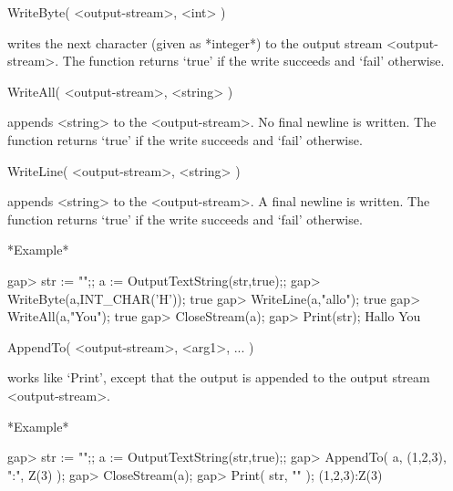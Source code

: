 \>WriteByte( <output-stream>, <int> )

writes the  next  character  (given  as *integer*)  to the  output stream
<output-stream>.  The function  returns `true' if  the write succeeds and
`fail' otherwise.

\>WriteAll( <output-stream>, <string> )

appends  <string> to the <output-stream>.   No final  newline is written.
The function returns `true' if the write succeeds and `fail' otherwise.

\>WriteLine( <output-stream>, <string> )

appends  <string> to  the <output-stream>.   A  final newline is written.
The function returns `true' if the write succeeds and `fail' otherwise.

*Example*

\beginexample
    gap> str := "";; a := OutputTextString(str,true);;
    gap> WriteByte(a,INT_CHAR('H'));
    true
    gap> WriteLine(a,"allo");
    true
    gap> WriteAll(a,"You\n");
    true
    gap> CloseStream(a);
    gap> Print(str);
    Hallo
    You
\endexample

\>AppendTo( <output-stream>, <arg1>, ... )

works like  `Print',  except that the  output is  appended to the  output
stream <output-stream>.

*Example*

\beginexample
    gap> str := "";; a := OutputTextString(str,true);;
    gap> AppendTo( a, (1,2,3), ":", Z(3) );
    gap> CloseStream(a);
    gap> Print( str, "\n" );
    (1,2,3):Z(3)
\endexample
